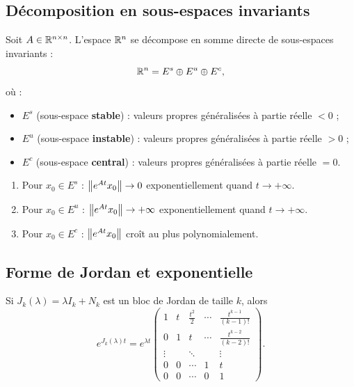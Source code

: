 \subsection{D\'ecomposition en sous-espaces invariants}

\begin{theoreme}
Soit $A \in \mathbb{R}^{n \times n}$. L'espace $\mathbb{R}^n$ se d\'ecompose en somme directe
de sous-espaces invariants :
\[
    \mathbb{R}^n = E^s \oplus E^u \oplus E^c,
\]
o\`u :
\begin{itemize}
    \item $E^s$ (sous-espace \textbf{stable}) : valeurs propres g\'en\'eralis\'ees
    \`a partie r\'eelle $< 0$ ;
    \item $E^u$ (sous-espace \textbf{instable}) : valeurs propres g\'en\'eralis\'ees
    \`a partie r\'eelle $> 0$ ;
    \item $E^c$ (sous-espace \textbf{central}) : valeurs propres g\'en\'eralis\'ees
    \`a partie r\'eelle $= 0$.
\end{itemize}
\end{theoreme}

\begin{proposition}
\begin{enumerate}
    \item Pour $x_0 \in E^s$ : $\left\| e^{At} x_0 \right\| \to 0$ exponentiellement
    quand $t \to +\infty$.
    \item Pour $x_0 \in E^u$ : $\left\| e^{At} x_0 \right\| \to +\infty$ exponentiellement
    quand $t \to +\infty$.
    \item Pour $x_0 \in E^c$ : $\left\| e^{At} x_0 \right\|$ cro\^it au plus
    polynomialement.
\end{enumerate}
\end{proposition}

\subsection{Forme de Jordan et exponentielle}

\begin{proposition}
Si $J_k(\lambda) = \lambda I_k + N_k$ est un bloc de Jordan de taille $k$,
alors
\[
    e^{J_k(\lambda)t} = e^{\lambda t}
    \begin{pmatrix}
        1 & t & \frac{t^2}{2} & \cdots & \frac{t^{k-1}}{(k-1)!} \\
        0 & 1 & t & \cdots & \frac{t^{k-2}}{(k-2)!} \\
        \vdots & & \ddots & & \vdots \\
        0 & 0 & \cdots & 1 & t \\
        0 & 0 & \cdots & 0 & 1
    \end{pmatrix}.
\]
\end{proposition}


